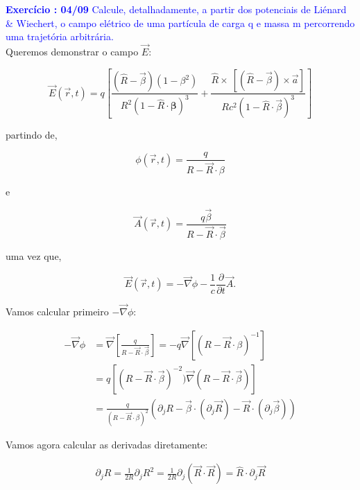 \textcolor{blue}{\textbf{Exercício \paragraphnum: 04/09}
	Calcule, detalhadamente, a partir dos potenciais de Liénard \& Wiechert, o campo elétrico de uma partícula de carga q e massa m percorrendo uma trajetória arbitrária.}
\bigskip\\


Queremos demonstrar o campo $\vec{E}$:

\begin{equation}
	\vec{E}(\vec{r}, t) = q\left[\frac{(\hat{R}-\vec{\beta})(1-\beta^2)}{R^2(1-\hat{R}\cdot\mathbf{\beta})^3} + \frac{\hat{R}\times\ \left[ (\hat{R}-\vec{\beta})\times \vec{a} \right]}{Rc^2(1-\hat{R}\cdot\vec{\beta})^3}\right]
\end{equation}

 partindo de,
 
 \begin{equation}
 	\phi(\vec{r},t)=\frac{q}{R-\vec{R}\cdot{\beta}}
 \end{equation}
 
 e
 
 \begin{equation}
 	\vec{A}(\vec{r},t) = \frac{q\vec{\beta}}{R-\vec{R}\cdot\vec{\beta}}
 \end{equation}
 
 uma vez que,
 
 \begin{equation}
 	\vec{E}(\vec{r},t) = -\vec{\nabla}\phi-\frac{1}{c}\frac{\partial}{\partial t}\vec{A}.
 \end{equation}
 
Vamos calcular primeiro $-\vec{\nabla}\phi$:
 
 \begin{equation}
 	\begin{split}
 	-\vec{\nabla}\phi &= \vec{\nabla}\left[\frac{q}{R-\vec{R}\cdot\vec{\beta}}\right] = -q \vec{\nabla}\left[(R-\vec{R}\cdot{\beta})^{-1}\right] \\ 
 	& = q\left[(R-\vec{R}\cdot\vec{\beta})^{-2}) \vec{\nabla}(R-\vec{R}\cdot\vec{\beta}) \right]\\
 	& = \frac{q}{(R-\vec{R}\cdot{\beta})^2}(\partial_j R -\vec{\beta}\cdot(\partial_j \vec{R}) - \vec{R}\cdot({\partial_j \vec{\beta}}))
 	\end{split}
 	\label{eq5:nablaphi}
 \end{equation}
 
Vamos agora calcular as derivadas diretamente:

\begin{equation}
	\begin{split}
		\partial_j R = \frac{1}{2R}\partial_j R^2 = \frac{1}{2R}\partial_j(\vec{R}\cdot\vec{R}) = \hat{R} \cdot \partial_j \vec{R} 
	\end{split}
\end{equation}

